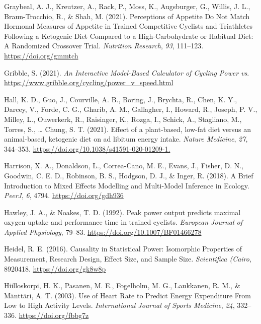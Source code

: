 \documentclass[]{cik}%
\newlength{\cslhangindent}
\newlength{\cslentryspacingunit} %
\newenvironment{CSLReferences}[2] %
 {%
  \setlength{\parindent}{0pt}
  \ifodd #1
  \let\oldpar\par
  \def\par{\hangindent=\cslhangindent\oldpar}
  \fi
  \setlength{\parskip}{#2\cslentryspacingunit}
 }%
 {}
\begin{document}
\begin{CSLReferences}{1}{0}
\leavevmode{}%
Graybeal, A. J., Kreutzer, A., Rack, P., Moss, K., Augsburger, G.,
Willis, J. L., Braun-Trocchio, R., \& Shah, M. (2021). Perceptions of
Appetite Do Not Match Hormonal Measures of Appetite in Trained
Competitive Cyclists and Triathletes Following a Ketogenic Diet Compared
to a High-Carbohydrate or Habitual Diet: A Randomized Crossover Trial.
\emph{Nutrition Research}, \emph{93}, 111--123.
\url{https://doi.org/gmmtch}

\leavevmode{}%
Gribble, S. (2021). \emph{An Interactive Model-Based Calculator of
Cycling Power vs}.
\url{https://www.gribble.org/cycling/power_v_speed.html}

\leavevmode{}%
Hall, K. D., Guo, J., Courville, A. B., Boring, J., Brychta, R., Chen,
K. Y., Darcey, V., Forde, C. G., Gharib, A. M., Gallagher, I., Howard,
R., Joseph, P. V., Milley, L., Ouwerkerk, R., Raisinger, K., Rozga, I.,
Schick, A., Stagliano, M., Torres, S., \ldots{} Chung, S. T. (2021).
Effect of a plant-based, low-fat diet versus an animal-based, ketogenic
diet on ad libitum energy intake. \emph{Nature Medicine}, \emph{27},
344--353. \url{https://doi.org/10.1038/s41591-020-01209-1.}

\leavevmode{}%
Harrison, X. A., Donaldson, L., Correa-Cano, M. E., Evans, J., Fisher,
D. N., Goodwin, C. E. D., Robinson, B. S., Hodgson, D. J., \& Inger, R.
(2018). A Brief Introduction to Mixed Effects Modelling and Multi-Model
Inference in Ecology. \emph{PeerJ}, \emph{6}, 4794.
\url{https://doi.org/gdh936}

\leavevmode{}%
Hawley, J. A., \& Noakes, T. D. (1992). Peak power output predicts
maximal oxygen uptake and performance time in trained cyclists.
\emph{European Journal of Applied Physiology}, 79--83.
\url{https://doi.org/10.1007/BF01466278}

\leavevmode{}%
Heidel, R. E. (2016). Causality in Statistical Power: Isomorphic
Properties of Measurement, Research Design, Effect Size, and Sample
Size. \emph{Scientifica (Cairo}, 8920418. \url{https://doi.org/gk8w8p}

\leavevmode{}%
Hiilloskorpi, H. K., Pasanen, M. E., Fogelholm, M. G., Laukkanen, R. M.,
\& Mänttäri, A. T. (2003). Use of Heart Rate to Predict Energy
Expenditure From Low to High Activity Levels. \emph{International
Journal of Sports Medicine}, \emph{24}, 332--336.
\url{https://doi.org/fbbg7z}


\end{CSLReferences}
\end{document}
